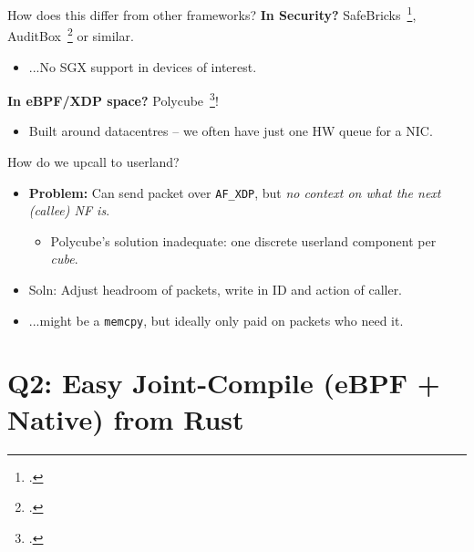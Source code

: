 \documentclass[aspectratio=169,xcolor={dvipsnames}
,handout
]{beamer}
\begin{document}
\begin{frame}{How does this differ from other frameworks?}
	\textbf{In Security?} SafeBricks~\footcite{DBLP:conf/nsdi/PoddarLPR18}, AuditBox~\footcite{DBLP:conf/nsdi/LiuSKPSS21} or similar.
	\begin{itemize}
		\item ...No SGX support in devices of interest.
	\end{itemize}
	
	\textbf{In eBPF/XDP space?} Polycube~\footcite{DBLP:journals/tnsm/MianoRBBL21}!
	\begin{itemize}
		\item Built around datacentres -- we often have just one HW queue for a NIC.
	\end{itemize}
\end{frame}

\begin{frame}{How do we upcall to userland?}
	\begin{itemize}
		\item \textbf{Problem:} Can send packet over \texttt{AF\_XDP}, but \emph{no context on what the next (callee) NF is}.
		\begin{itemize}
			\item Polycube's solution inadequate: one discrete userland component per \emph{cube}.
		\end{itemize}
		\item \alert{Soln:} Adjust headroom of packets, write in ID and action of caller.
		\item ...might be a \texttt{memcpy}, but ideally only paid on packets who need it.
	\end{itemize}
\end{frame}

\section{Q2: Easy Joint-Compile (eBPF + Native) from Rust }
\end{document}
